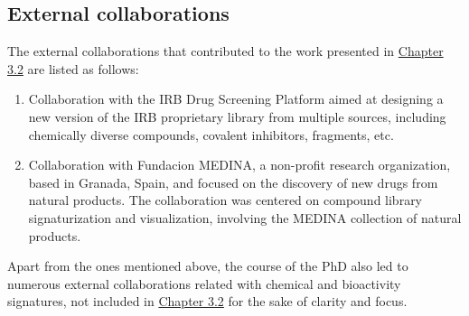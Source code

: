 \clearpage
{}
\subsection{External collaborations}

The external collaborations that contributed to the work presented in \hyperref[Chapter_3.2]{Chapter 3.2} are listed as follows:

\begin{enumerate} 
\item[\textbullet] Collaboration with the IRB Drug Screening Platform aimed at designing a new version of the IRB proprietary library from multiple sources, including chemically diverse compounds, covalent inhibitors, fragments, etc. 
\item[\textbullet] Collaboration with Fundacion MEDINA, a non-profit research organization, based in Granada, Spain, and focused on the discovery of new drugs from natural products. The collaboration was centered on compound library signaturization and visualization, involving the MEDINA collection of natural products.
\end{enumerate}

Apart from the ones mentioned above, the course of the PhD also led to numerous external collaborations related with chemical and bioactivity signatures, not included in \hyperref[Chapter_3.2]{Chapter 3.2} for the sake of clarity and focus. 

